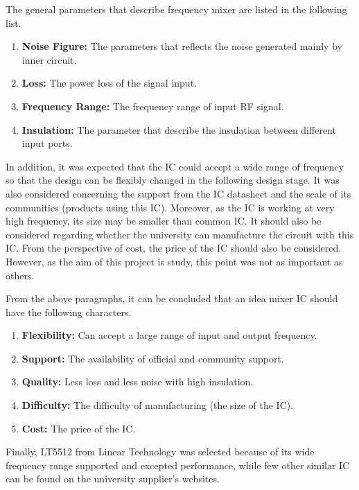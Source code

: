\documentclass[12pt, a4paper]{report}
\begin{document}
The general parameters that describe frequency mixer are listed in the following list.

\newpage

\begin{enumerate} \addtolength{\itemsep}{-0.5\baselineskip}
    \item \textbf{Noise Figure:} The parameters that reflects the noise generated mainly by inner circuit.
    \item \textbf{Loss:} The power loss of the signal input.
    \item \textbf{Frequency Range:} The frequency range of input RF signal.
    \item \textbf{Insulation:} The parameter that describe the insulation between different input ports.
\end{enumerate}


In addition, it was expected that the IC could accept a wide range of frequency so that the design can be flexibly changed in the following design stage. It was also considered concerning the support from the IC datasheet and the scale of its communities (products using this IC). Moreover, as the IC is working at very high frequency, its size may be smaller than common IC. It should also be considered regarding whether the university can manufacture the circuit with this IC. From the perspective of cost, the price of the IC should also be considered. However, as the aim of this project is study, this point was not as important as others.

From the above paragraphs, it can be concluded that an idea mixer IC should have the following characters.

\begin{enumerate} \addtolength{\itemsep}{-0.5\baselineskip}
    \item \textbf{Flexibility:} Can accept a large range of input and output frequency.
    \item \textbf{Support:} The availability of official and community support.
    \item \textbf{Quality: } Less loss and less noise with high insulation.
    \item \textbf{Difficulty:} The difficulty of manufacturing (the size of the IC). 
    \item \textbf{Cost:} The price of the IC.
\end{enumerate}

Finally, LT5512\cite{ref:LT5512} from Linear Technology was selected because of its wide frequency range supported and excepted performance, while few other similar IC can be found on the university supplier's websites.
\end{document}
